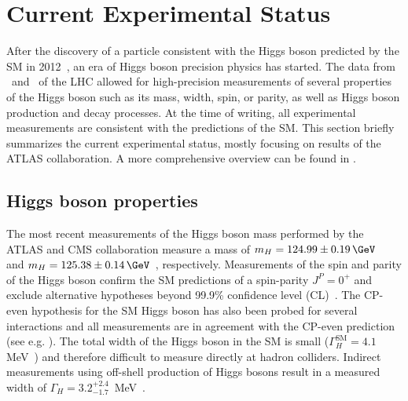 \section{Current Experimental Status}
\label{subsec:higgs-exp-status}
After the discovery of a particle consistent with the Higgs boson predicted by the SM in 2012~\cite{HIGG-2012-27,CMS-HIG-12-028}, an era of Higgs boson precision physics has started.
The data from \RunOne\ and \RunTwo\ of the LHC allowed for high-precision measurements of several properties of the Higgs boson such as its mass, width, spin, or parity, as well as Higgs boson production and decay processes. 
At the time of writing, all experimental measurements are consistent with the predictions of the SM.
This section briefly summarizes the current experimental status, mostly focusing on results of the ATLAS collaboration.
A more comprehensive overview can be found in . 

\subsection{Higgs boson properties}
The most recent measurements of the Higgs boson mass performed by the ATLAS and CMS collaboration measure a mass of $m_H = 124.99 \pm 0.19\,\GeV$~\cite{https://doi.org/10.48550/arxiv.2207.00320} and $m_H = 125.38 \pm 0.14\,\GeV$~\cite{CMS-HIG-19-004}, respectively.
Measurements of the spin and parity of the Higgs boson confirm the SM predictions of a spin-parity $J^{P} = 0^{+}$ and exclude alternative hypotheses beyond 99.9\% confidence level (CL)~\cite{HIGG-2013-17-witherratum,CMS-HIG-14-018}.
The CP-even hypothesis for the SM Higgs boson has also been probed for several interactions and all measurements are in agreement with the CP-even prediction (see e.g. ).
The total width of the Higgs boson in the SM is small ($\Gamma_H^{\text{SM}} = 4.1\,$ MeV~\cite{deFlorian:2016spz}) and therefore difficult to measure directly at hadron colliders. Indirect measurements using off-shell production of Higgs bosons result in a measured width of $\Gamma_H = 3.2 ^{+2.4}_{-1.7}\,$ MeV~\cite{https://doi.org/10.48550/arxiv.2202.06923}.

